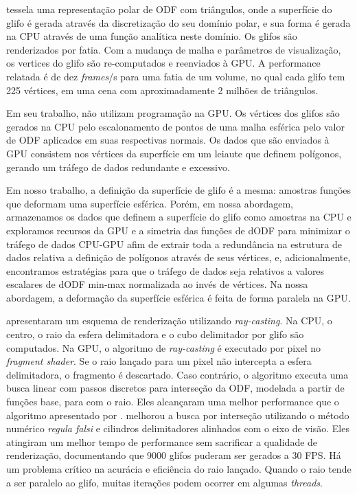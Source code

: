 
 tessela uma representação polar de ODF com triângulos, onde a superfície do glifo é gerada através da discretização do seu domínio polar, e sua forma é gerada na CPU através de uma função analítica neste domínio. Os glifos são renderizados por fatia. Com a mudança de malha e parâmetros de visualização, os vertices do glifo são re-computados e reenviados à GPU. A performance relatada é de dez \textit{frames}/s para uma fatia de um volume, no qual cada glifo tem 225 vértices, em uma cena com aproximadamente 2 milhões de triângulos.

Em seu trabalho,  não utilizam programação na GPU. Os vértices dos glifos são gerados na CPU pelo escalonamento de pontos de uma malha esférica pelo valor de ODF aplicados em suas respectivas normais. Os dados que são enviados à GPU consistem nos vértices da superfície em um leiaute que definem polígonos, gerando um tráfego de dados redundante e excessivo.

Em nosso trabalho, a definição da superfície de glifo é a mesma: amostras funções que deformam uma superfície esférica. Porém, em nossa abordagem, armazenamos os dados que definem a superfície do glifo como amostras na CPU e exploramos recursos da GPU e a simetria das funções de dODF para minimizar o tráfego de dados CPU-GPU afim de extrair toda a redundância na estrutura de dados relativa a definição de polígonos através de seus vértices, e, adicionalmente, encontramos estratégias para que o tráfego de dados seja relativos a valores escalares de dODF min-max normalizada ao invés de vértices. Na nossa abordagem, a deformação da superfície esférica é feita de forma paralela na GPU.


 apresentaram um esquema de renderização utilizando \textit{ray-casting}. Na CPU, o centro, o raio da esfera delimitadora e o cubo delimitador por glifo são computados. Na GPU, o algoritmo de \textit{ray-casting} é executado por pixel no \textit{fragment shader}. Se o raio lançado para um pixel não intercepta a esfera delimitadora, o fragmento é descartado. Caso contrário, o algoritmo executa uma busca linear com passos discretos para interseção da ODF, modelada a partir de funções base, para com o raio. Eles alcançaram uma melhor performance que o algoritmo apresentado por .  melhorou a busca por interseção utilizando o método numérico \textit{regula falsi} e cilindros delimitadores alinhados com o eixo de visão. Eles atingiram um melhor tempo de performance sem sacrificar a qualidade de renderização, documentando que 9000 glifos puderam ser gerados a 30 FPS. Há um problema crítico na acurácia e eficiência do raio lançado. Quando o raio tende a ser paralelo ao glifo, muitas iterações podem ocorrer em algumas \textit{threads}.

